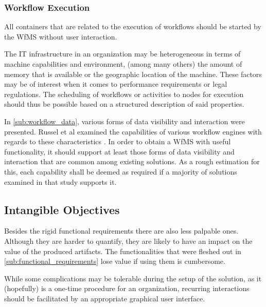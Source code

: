 
  \subsubsection{Workflow Execution} %
    \label{ssub:workflow_execution}
        All containers that are related to the execution of workflows should be started by the \ac{WfMS} without user interaction.

        The IT infrastructure in an organization may be heterogeneous in terms of machine capabilities and environment, \eg (among many others) the amount of memory that is available or the geographic location of the machine. These factors may be of interest when it comes to performance requirements or legal regulations. The scheduling of workflows or activities to nodes for execution should thus be possible based on a structured description of said properties.

        In \ref{sub:workflow_data}, various forms of data visibility and interaction were presented. Russel et al examined the capabilities of various workflow engines with regards to these characteristics \cite{Russell2005Workflow}. In order to obtain a \ac{WfMS} with useful functionality, it should support at least those forms of data visibility and interaction that are common among existing solutions. As a rough estimation for this, each capability shall be deemed as required if a majority of solutions examined in that study supports it.


\subsection{Intangible Objectives} %
  \label{sub:intangible_requirements}

  Besides the rigid functional requirements there are also less palpable ones. Although they are harder to quantify, they are likely to have an impact on the value of the produced artifacts. The functionalities that were fleshed out in \ref{sub:functional_requirements} lose value if using them is cumbersome.

  While some complications may be tolerable during the setup of the solution, as it (hopefully) is a one-time procedure for an organization, recurring interactions should be facilitated by an appropriate graphical user interface.

